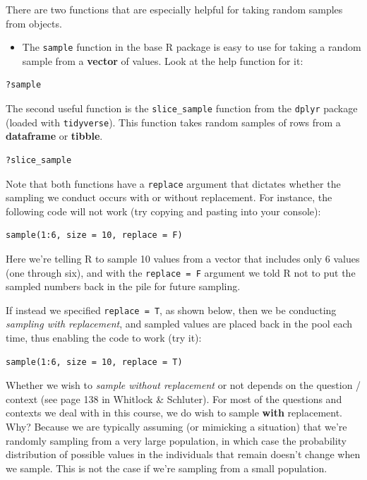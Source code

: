 \documentclass[
]{book}
\providecommand{\tightlist}{%
  \setlength{\itemsep}{0pt}\setlength{\parskip}{0pt}}
\begin{document}
There are two functions that are especially helpful for taking random samples from objects.

\begin{itemize}
\tightlist
\item
  The \texttt{sample} function in the base R package is easy to use for taking a random sample from a \textbf{vector} of values. Look at the help function for it:
\end{itemize}

\begin{verbatim}
?sample
\end{verbatim}

The second useful function is the \texttt{slice\_sample} function from the \texttt{dplyr} package (loaded with \texttt{tidyverse}). This function takes random samples of rows from a \textbf{dataframe} or \textbf{tibble}.

\begin{verbatim}
?slice_sample
\end{verbatim}

Note that both functions have a \texttt{replace} argument that dictates whether the sampling we conduct occurs with or without replacement. For instance, the following code will not work (try copying and pasting into your console):

\begin{verbatim}
sample(1:6, size = 10, replace = F)
\end{verbatim}

Here we're telling R to sample 10 values from a vector that includes only 6 values (one through six), and with the \texttt{replace\ =\ F} argument we told R not to put the sampled numbers back in the pile for future sampling.

If instead we specified \texttt{replace\ =\ T}, as shown below, then we be conducting \emph{sampling with replacement}, and sampled values are placed back in the pool each time, thus enabling the code to work (try it):

\begin{verbatim}
sample(1:6, size = 10, replace = T)
\end{verbatim}

Whether we wish to \emph{sample without replacement} or not depends on the question / context (see page 138 in Whitlock \& Schluter). For most of the questions and contexts we deal with in this course, we do wish to sample \textbf{with} replacement. Why? Because we are typically assuming (or mimicking a situation) that we're randomly sampling from a very large population, in which case the probability distribution of possible values in the individuals that remain doesn't change when we sample. This is not the case if we're sampling from a small population.
\end{document}
